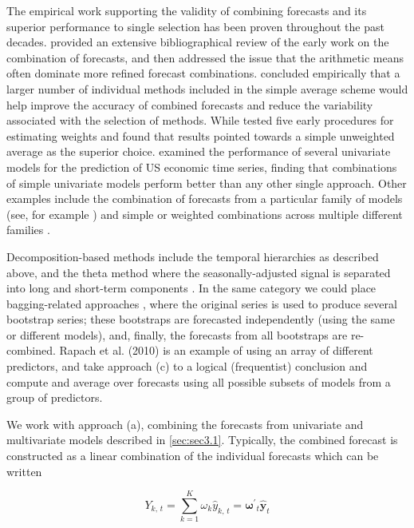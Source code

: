 \documentclass[
a4paper, %
12pt, %
]{CascadeAnalyticsWPS}
\begin{document}
The empirical work supporting the validity of combining forecasts and its superior performance to single selection has been proven throughout the past decades. \cite{clemen89}
provided an extensive bibliographical review of the early work on the combination of forecasts, and
then addressed the issue that the arithmetic means often dominate more refined forecast combinations.
\cite{makridakis83} concluded empirically that a larger number of individual methods included in the simple average scheme would help improve the accuracy of combined forecasts and reduce the variability associated with the selection of methods. While \cite{winkler83} tested five early procedures for estimating weights and found that results pointed towards a simple unweighted average as the superior choice. \cite{stock_comparison_1998} examined the performance of several univariate models for the prediction of US economic time series, finding that combinations of simple univariate models perform better than any other single approach. Other examples include the combination of forecasts from a particular family of models (see, for example \cite{kourentzes_another_2019}) and simple or weighted combinations across multiple different families \citep{petropoulos_simple_2020, montero_2020}. 

Decomposition-based methods include the temporal hierarchies as described above, and the theta method where the seasonally-adjusted signal is separated into long and short-term components \citep{assimakopoulos_2000}. In the same category we could place bagging-related approaches \citep{bergmeir_2016, petropoulos_exploring_2018}, where the original series is used to produce several bootstrap series; these bootstraps are forecasted independently (using the same or different models), and, finally, the forecasts from all bootstraps are re-combined. Rapach et al. (2010) is an example of using an array of different predictors, and \cite{elliott_complete_2015} take approach (c) to a logical (frequentist) conclusion and compute and average over forecasts using all possible subsets of models from a group of predictors.


We work with approach (a), combining the forecasts from univariate and multivariate models described in \ref{sec:sec3.1}. Typically, the combined forecast is constructed as a linear combination of the individual forecasts \citep{newbold74, clemen86,petropoulos_simple_2020}
which can be written 

\begin{equation}
	Y_{k,\,t} = \sum\limits_{k =1}^{K}\omega_{k}\hat{y}_{k,\,t} = \bm{\omega^{\prime}}_{t}\hat{\mathbf{{y}}}_{t}
\end{equation}
\end{document}
